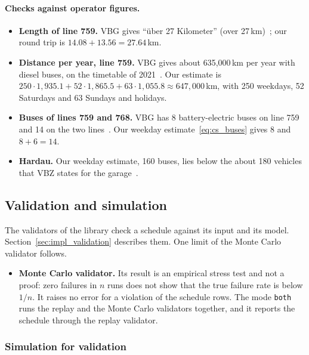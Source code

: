 \documentclass[11pt,a4paper]{article}
\theoremstyle{plain}
\theoremstyle{definition}
\theoremstyle{remark}
\begin{document}
\paragraph{Checks against operator figures.}
\begin{itemize}
  \item \textbf{Length of line 759.} VBG gives ``\"uber 27 Kilometer'' (over 27\,km)~\cite{VBG2023Line759}; our round trip is $14.08 + 13.56 = 27.64$\,km.
  \item \textbf{Distance per year, line 759.} VBG gives about 635,000\,km per year with diesel buses, on the timetable of 2021~\cite[p.~1]{VBG2021Line759}.
    Our estimate is $250 \cdot 1{,}935.1 + 52 \cdot 1{,}865.5 + 63 \cdot 1{,}055.8 \approx 647{,}000$\,km, with 250 weekdays, 52 Saturdays and 63 Sundays and holidays.
  \item \textbf{Buses of lines 759 and 768.} VBG has 8 battery-electric buses on line 759~\cite{VBG2023Release759} and 14 on the two lines~\cite[p.~4]{VBG2026Report}\cite{VBG2026Fleet}.
    Our weekday estimate~\eqref{eq:cs_buses} gives 8 and $8+6=14$.
  \item \textbf{Hardau.} Our weekday estimate, 160 buses, lies below the about 180 vehicles that VBZ states for the garage~\cite{VBZ2026Depots}.
\end{itemize}

\subsection{Validation and simulation}

The validators of the library check a schedule against its input and its model.
Section~\ref{sec:impl_validation} describes them.
One limit of the Monte Carlo validator follows.
\begin{itemize}
  \item \textbf{Monte Carlo validator.} Its result is an empirical stress test and not a proof: zero failures in $n$ runs does not show that the true failure rate is below $1/n$.
    It raises no error for a violation of the schedule rows.
    The mode \texttt{both} runs the replay and the Monte Carlo validators together, and it reports the schedule through the replay validator.
\end{itemize}

\subsubsection{Simulation for validation}\label{sec:cs_simulation}
\end{document}

